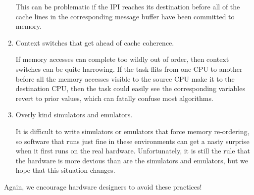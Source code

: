 \begin{enumerate}
	This can be problematic if the IPI reaches its destination
	before all of the cache lines in the corresponding message
	buffer have been committed to memory.

\item	Context switches that get ahead of cache coherence.

	If memory accesses can complete too wildly out of order,
	then context switches can be quite harrowing.
	If the task flits from one CPU to another before all the
	memory accesses visible to the source CPU make it to the
	destination CPU, then the task could easily see the corresponding
	variables revert to prior values, which can fatally confuse
	most algorithms.

\item	Overly kind simulators and emulators.

	It is difficult to write simulators or emulators that force
	memory re-ordering, so software that runs just fine in
	these environments can get a nasty surprise when it first
	runs on the real hardware.
	Unfortunately, it is still the rule that the hardware is more
	devious than are the simulators and emulators, but we hope that
	this situation changes.
\end{enumerate}

Again, we encourage hardware designers to avoid these practices!
